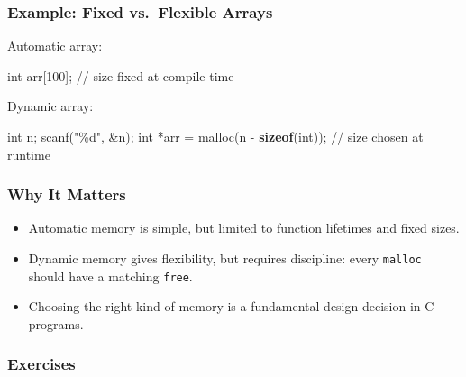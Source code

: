 \documentclass[
  letterpaper,
  DIV=11,
  numbers=noendperiod]{scrreprt}
\newenvironment{Shaded}{\begin{snugshade}}{\end{snugshade}}
\newcommand{\CommentTok}[1]{\textcolor[rgb]{0.37,0.37,0.37}{#1}}
\newcommand{\DataTypeTok}[1]{\textcolor[rgb]{0.68,0.00,0.00}{#1}}
\newcommand{\DecValTok}[1]{\textcolor[rgb]{0.68,0.00,0.00}{#1}}
\newcommand{\KeywordTok}[1]{\textcolor[rgb]{0.00,0.23,0.31}{\textbf{#1}}}
\newcommand{\NormalTok}[1]{\textcolor[rgb]{0.00,0.23,0.31}{#1}}
\newcommand{\OperatorTok}[1]{\textcolor[rgb]{0.37,0.37,0.37}{#1}}
\newcommand{\SpecialCharTok}[1]{\textcolor[rgb]{0.37,0.37,0.37}{#1}}
\newcommand{\StringTok}[1]{\textcolor[rgb]{0.13,0.47,0.30}{#1}}
\providecommand{\tightlist}{%
  \setlength{\itemsep}{0pt}\setlength{\parskip}{0pt}}
\begin{document}
\subsubsection{Example: Fixed vs.~Flexible
Arrays}\label{example-fixed-vs.-flexible-arrays}

Automatic array:

\begin{Shaded}
\begin{Highlighting}[]
\DataTypeTok{int}\NormalTok{ arr}\OperatorTok{[}\DecValTok{100}\OperatorTok{];}  \CommentTok{// size fixed at compile time}
\end{Highlighting}
\end{Shaded}

Dynamic array:

\begin{Shaded}
\begin{Highlighting}[]
\DataTypeTok{int}\NormalTok{ n}\OperatorTok{;}
\NormalTok{scanf}\OperatorTok{(}\StringTok{"}\SpecialCharTok{\%d}\StringTok{"}\OperatorTok{,} \OperatorTok{\&}\NormalTok{n}\OperatorTok{);}
\DataTypeTok{int} \OperatorTok{*}\NormalTok{arr }\OperatorTok{=}\NormalTok{ malloc}\OperatorTok{(}\NormalTok{n }\OperatorTok{{-}} \KeywordTok{sizeof}\OperatorTok{(}\DataTypeTok{int}\OperatorTok{));}  \CommentTok{// size chosen at runtime}
\end{Highlighting}
\end{Shaded}

\subsubsection{Why It Matters}\label{why-it-matters-39}

\begin{itemize}
\tightlist
\item
  Automatic memory is simple, but limited to function lifetimes and
  fixed sizes.
\item
  Dynamic memory gives flexibility, but requires discipline: every
  \texttt{malloc} should have a matching \texttt{free}.
\item
  Choosing the right kind of memory is a fundamental design decision in
  C programs.
\end{itemize}

\subsubsection{Exercises}\label{exercises-40}
\end{document}

